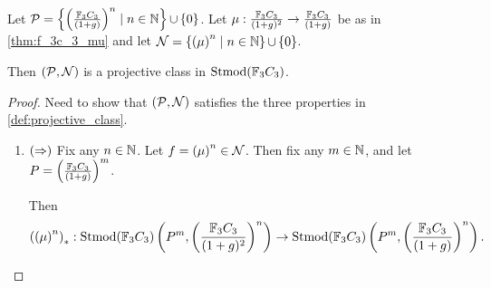 \begin{theorem}
    Let \( {\mathcal{P}} = \left\{ \left( \frac{{\mathbb{F}}_3C_3}{(1 + g)} \right)^n \mid n \in {\mathbb{N}} \right\} \mathop{\cup}\limits \left\{ 0 \right\} \). Let \( \mu: \frac{{\mathbb{F}}_3C_3}{(1 + g)^2} \to \frac{{\mathbb{F}}_3C_3}{(1 + g)} \) be as in \autoref{thm:f_3c_3_mu} and let \( {\mathcal{N}} = \left\{ \left( \mu \right)^n \mid n \in {\mathbb{N}} \right\} \mathop{\cup}\limits \left\{ 0 \right\} \).

    Then \( \left( {\mathcal{P}}, {\mathcal{N}}\right) \) is a projective class in \( \operatorname{Stmod}({\mathbb{F}}_3C_3) \).
\end{theorem}
\begin{proof}
    Need to show that \( \left( {\mathcal{P}}, {\mathcal{N}} \right) \) satisfies the three properties in \autoref{def:projective_class}.

    \begin{enumerate}
        \item {
            \( \left( \Rightarrow \right) \) Fix any \( n \in {\mathbb{N}} \). Let \( f = \left( \mu \right)^n \in {\mathcal{N}} \).
            Then fix any \( m \in {\mathbb{N}} \), and let \( P = \left( \frac{{\mathbb{F}}_3C_3}{(1 + g)} \right)^m \).

            Then 
            \[
                \left( \left( \mu \right)^n \right)_* : \operatorname{Stmod}({\mathbb{F}}_3C_3)\left(P^m, \left(\frac{{\mathbb{F}}_3C_3}{(1 + g)^2}\right)^n \right) \to \operatorname{Stmod}({\mathbb{F}}_3C_3)\left(P^m, \left(\frac{{\mathbb{F}}_3C_3}{(1 + g)}\right)^n \right).
            \]
            
        }
    \end{enumerate}
\end{proof}